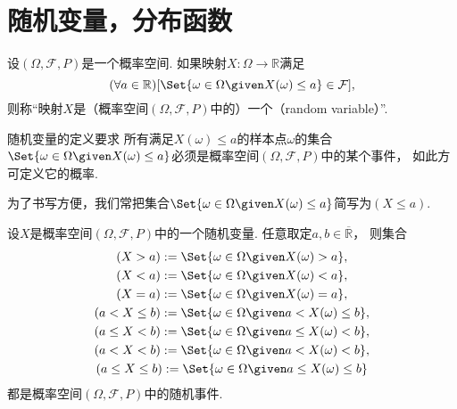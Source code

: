 \section{随机变量，分布函数}
\begin{definition}
设\((\Omega,\mathcal{F},P)\)是一个概率空间.
如果映射\(X\colon \Omega \to \mathbb{R}\)满足\begin{equation*}
	(\forall a \in \mathbb{R})
	[
		\Set{
			\omega \in \Omega
			\given
			X(\omega) \leq a
		}
		\in \mathcal{F}
	],
\end{equation*}
则称“映射\(X\)是（概率空间\((\Omega,\mathcal{F},P)\)中的）一个（random variable）”.
\end{definition}
\begin{remark}
随机变量的定义要求
所有满足\(X(\omega) \leq a\)的样本点\(\omega\)的集合\(
	\Set{
		\omega \in \Omega
		\given
		X(\omega) \leq a
	}
\)必须是概率空间\((\Omega,\mathcal{F},P)\)中的某个事件，
如此方可定义它的概率.
\end{remark}
\begin{remark}
为了书写方便，我们常把集合\(
	\Set{
		\omega \in \Omega
		\given
		X(\omega) \leq a
	}
\)简写为\((X \leq a)\).
\end{remark}

\begin{theorem}
设\(X\)是概率空间\((\Omega,\mathcal{F},P)\)中的一个随机变量.
任意取定\(a,b \in \overline{\mathbb{R}}\)，
则集合\begin{gather*}
	(X > a)
	\defeq
	\Set{
		\omega \in \Omega
		\given
		X(\omega) > a
	}, \\
	(X < a)
	\defeq
	\Set{
		\omega \in \Omega
		\given
		X(\omega) < a
	}, \\
	(X = a)
	\defeq
	\Set{
		\omega \in \Omega
		\given
		X(\omega) = a
	}, \\
	(a < X \leq b)
	\defeq
	\Set{
		\omega \in \Omega
		\given
		a < X(\omega) \leq b
	}, \\
	(a \leq X < b)
	\defeq
	\Set{
		\omega \in \Omega
		\given
		a \leq X(\omega) < b
	}, \\
	(a < X < b)
	\defeq
	\Set{
		\omega \in \Omega
		\given
		a < X(\omega) < b
	}, \\
	(a \leq X \leq b)
	\defeq
	\Set{
		\omega \in \Omega
		\given
		a \leq X(\omega) \leq b
	}
\end{gather*}
都是概率空间\((\Omega,\mathcal{F},P)\)中的随机事件.
\end{theorem}
